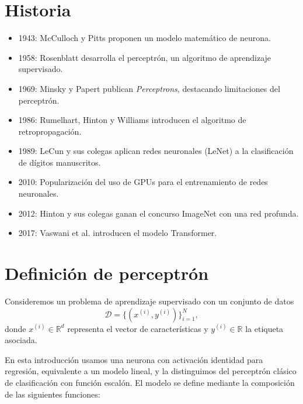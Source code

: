 \documentclass[a4,11pt]{aleph-notas}
\begin{document}
\encabezado

\section*{Historia}

\begin{itemize}
    \item 1943: McCulloch y Pitts proponen un modelo matemático de neurona.
    \item 1958: Rosenblatt desarrolla el perceptrón, un algoritmo de aprendizaje supervisado.
    \item 1969: Minsky y Papert publican \textit{Perceptrons}, destacando limitaciones del perceptrón.
    \item 1986: Rumelhart, Hinton y Williams introducen el algoritmo de retropropagación.
    \item 1989: LeCun y sus colegas aplican redes neuronales (LeNet) a la clasificación de dígitos manuscritos.
    \item 2010: Popularización del uso de GPUs para el entrenamiento de redes neuronales.
    \item 2012: Hinton y sus colegas ganan el concurso ImageNet con una red profunda.
    \item 2017: Vaswani et al. introducen el modelo Transformer.
\end{itemize}

\section*{Definición de perceptrón}

Consideremos un problema de aprendizaje supervisado con un conjunto de datos
\[
\mathcal{D} = \{(x^{(i)}, y^{(i)})\}_{i=1}^N,
\]
donde \(x^{(i)} \in \mathbb{R}^d\) representa el vector de características y
\(y^{(i)} \in \mathbb{R}\) la etiqueta asociada.

En esta introducción usamos una neurona con activación identidad para regresión, equivalente a un modelo lineal, y la distinguimos del perceptrón clásico de clasificación con función escalón. El modelo se define mediante la composición de las siguientes funciones:
\end{document}
